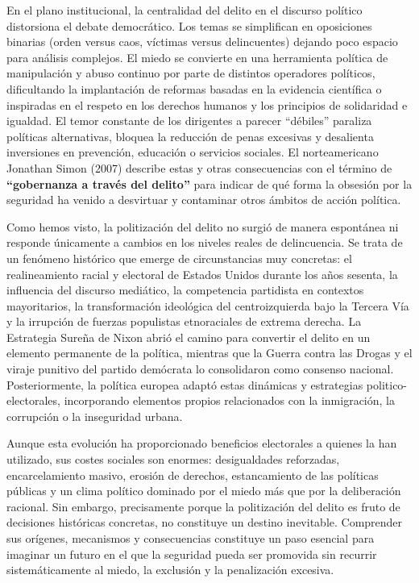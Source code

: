 \documentclass[
  spanish,
  letterpaper,
  DIV=11,
  numbers=noendperiod]{scrreprt}
\begin{document}
En el plano institucional, la centralidad del delito en el discurso
político distorsiona el debate democrático. Los temas se simplifican en
oposiciones binarias (orden versus caos, víctimas versus delincuentes)
dejando poco espacio para análisis complejos. El miedo se convierte en
una herramienta política de manipulación y abuso continuo por parte de
distintos operadores políticos, dificultando la implantación de reformas
basadas en la evidencia científica o inspiradas en el respeto en los
derechos humanos y los principios de solidaridad e igualdad. El temor
constante de los dirigentes a parecer ``débiles'' paraliza políticas
alternativas, bloquea la reducción de penas excesivas y desalienta
inversiones en prevención, educación o servicios sociales. El
norteamericano Jonathan Simon (2007) describe estas y otras
consecuencias con el término de \textbf{``gobernanza a través del
delito''} para indicar de qué forma la obsesión por la seguridad ha
venido a desvirtuar y contaminar otros ámbitos de acción política.

Como hemos visto, la politización del delito no surgió de manera
espontánea ni responde únicamente a cambios en los niveles reales de
delincuencia. Se trata de un fenómeno histórico que emerge de
circunstancias muy concretas: el realineamiento racial y electoral de
Estados Unidos durante los años sesenta, la influencia del discurso
mediático, la competencia partidista en contextos mayoritarios, la
transformación ideológica del centroizquierda bajo la Tercera Vía y la
irrupción de fuerzas populistas etnoraciales de extrema derecha. La
Estrategia Sureña de Nixon abrió el camino para convertir el delito en
un elemento permanente de la política, mientras que la Guerra contra las
Drogas y el viraje punitivo del partido demócrata lo consolidaron como
consenso nacional. Posteriormente, la política europea adaptó estas
dinámicas y estrategias politico-electorales, incorporando elementos
propios relacionados con la inmigración, la corrupción o la inseguridad
urbana.

Aunque esta evolución ha proporcionado beneficios electorales a quienes
la han utilizado, sus costes sociales son enormes: desigualdades
reforzadas, encarcelamiento masivo, erosión de derechos, estancamiento
de las políticas públicas y un clima político dominado por el miedo más
que por la deliberación racional. Sin embargo, precisamente porque la
politización del delito es fruto de decisiones históricas concretas, no
constituye un destino inevitable. Comprender sus orígenes, mecanismos y
consecuencias constituye un paso esencial para imaginar un futuro en el
que la seguridad pueda ser promovida sin recurrir sistemáticamente al
miedo, la exclusión y la penalización excesiva.
\end{document}
